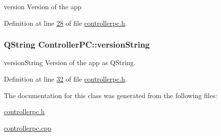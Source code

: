 version Version of the app 



Definition at line \hyperlink{controllerpc_8h_source_l00028}{28} of file \hyperlink{controllerpc_8h_source}{controllerpc.\-h}.

\hypertarget{class_controller_p_c_a0e63cca37d6ce2e660f3380400c2c5f3}{
\subsubsection[{version\-String}]{\setlength{\rightskip}{0pt plus 5cm}Q\-String Controller\-P\-C\-::version\-String}}\label{class_controller_p_c_a0e63cca37d6ce2e660f3380400c2c5f3}


version\-String Version of the app as Q\-String. 



Definition at line \hyperlink{controllerpc_8h_source_l00032}{32} of file \hyperlink{controllerpc_8h_source}{controllerpc.\-h}.



The documentation for this class was generated from the following files\-:\begin{DoxyCompactItemize}
\item 
\hyperlink{controllerpc_8h}{controllerpc.\-h}\item 
\hyperlink{controllerpc_8cpp}{controllerpc.\-cpp}\end{DoxyCompactItemize}
